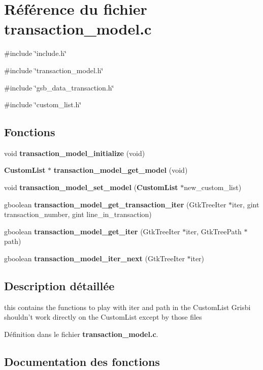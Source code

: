 \section{Référence du fichier transaction\_\-model.c}
\label{transaction__model_8c}
{\ttfamily \#include \char`\"{}include.h\char`\"{}}\par
{\ttfamily \#include \char`\"{}transaction\_\-model.h\char`\"{}}\par
{\ttfamily \#include \char`\"{}gsb\_\-data\_\-transaction.h\char`\"{}}\par
{\ttfamily \#include \char`\"{}custom\_\-list.h\char`\"{}}\par
\subsection*{Fonctions}
\begin{DoxyCompactItemize}
\item 
void {\bf transaction\_\-model\_\-initialize} (void)
\item 
{\bf CustomList} $\ast$ {\bf transaction\_\-model\_\-get\_\-model} (void)
\item 
void {\bf transaction\_\-model\_\-set\_\-model} ({\bf CustomList} $\ast$new\_\-custom\_\-list)
\item 
gboolean {\bf transaction\_\-model\_\-get\_\-transaction\_\-iter} (GtkTreeIter $\ast$iter, gint transaction\_\-number, gint line\_\-in\_\-transaction)
\item 
gboolean {\bf transaction\_\-model\_\-get\_\-iter} (GtkTreeIter $\ast$iter, GtkTreePath $\ast$path)
\item 
gboolean {\bf transaction\_\-model\_\-iter\_\-next} (GtkTreeIter $\ast$iter)
\end{DoxyCompactItemize}


\subsection{Description détaillée}
this contains the functions to play with iter and path in the CustomList Grisbi shouldn't work directly on the CustomList except by those files 

Définition dans le fichier {\bf transaction\_\-model.c}.



\subsection{Documentation des fonctions}
